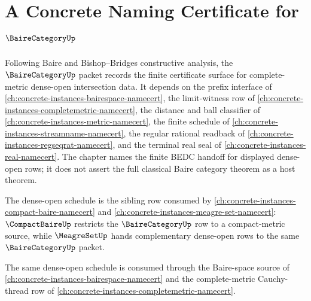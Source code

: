 \chapter{A Concrete Naming Certificate for $\BaireCategoryUp$}
\label{ch:concrete-instances-bairecategory-namecert}

Following Baire and Bishop--Bridges constructive analysis, the
$\BaireCategoryUp$ packet records the finite certificate surface for
complete-metric dense-open intersection data. It depends on the prefix
interface of \autoref{ch:concrete-instances-bairespace-namecert}, the
limit-witness row of \autoref{ch:concrete-instances-completemetric-namecert},
the distance and ball classifier of \autoref{ch:concrete-instances-metric-namecert},
the finite schedule of \autoref{ch:concrete-instances-streamname-namecert},
the regular rational readback of
\autoref{ch:concrete-instances-regseqrat-namecert}, and the terminal real seal
of \autoref{ch:concrete-instances-real-namecert}. The chapter names the
finite BEDC handoff for displayed dense-open rows; it does not assert the full
classical Baire category theorem as a host theorem.

The dense-open schedule is the sibling row consumed by
\autoref{ch:concrete-instances-compact-baire-namecert} and
\autoref{ch:concrete-instances-meagre-set-namecert}: $\CompactBaireUp$
restricts the $\BaireCategoryUp$ row to a compact-metric source, while
$\MeagreSetUp$ hands complementary dense-open rows to the same
$\BaireCategoryUp$ packet.

The same dense-open schedule is consumed through the Baire-space source of \autoref{ch:concrete-instances-bairespace-namecert} and the complete-metric Cauchy-thread row of \autoref{ch:concrete-instances-completemetric-namecert}.

